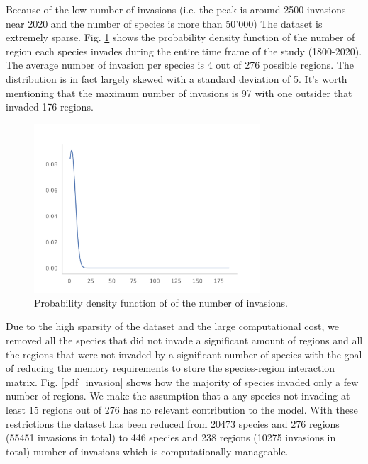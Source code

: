 \documentclass[mscthesis]{usiinfthesis}
\begin{document}
Because of the low number of invasions (i.e. the peak is around 2500 invasions near 2020 and the number of species is more than 50'000) The dataset is extremely sparse. Fig. \ref{fig:pdf_invasion} shows the probability density function of the number of region each species invades during the entire time frame of the study (1800-2020).  The average number of invasion per species is 4 out of 276 possible regions. The distribution is in fact largely skewed with a standard deviation of 5. It's worth mentioning that the maximum number of invasions is 97 with one outsider that invaded 176 regions.

\begin{figure}[H]
    \centering
    \includegraphics[width=0.75\textwidth]{species_region_invasion.png}
    \caption{Probability density function of of the number of invasions.}
    \label{fig:pdf_invasion}
\end{figure}


Due to the high sparsity of the dataset and the large computational cost, we removed all the species that did not invade a significant amount of regions and all the regions that were not invaded by a significant number of species with the goal of reducing the memory requirements to store the species-region interaction matrix. Fig. \ref{pdf_invasion} shows how the majority of species invaded only a few number of regions. We make the assumption that a any species not invading at least 15 regions out of 276 has no relevant contribution to the model. With these restrictions the dataset has been reduced from 20473 species and 276 regions (55451 invasions in total) to 446 species and 238 regions (10275 invasions in total) number of invasions which is computationally manageable. 
\end{document}
